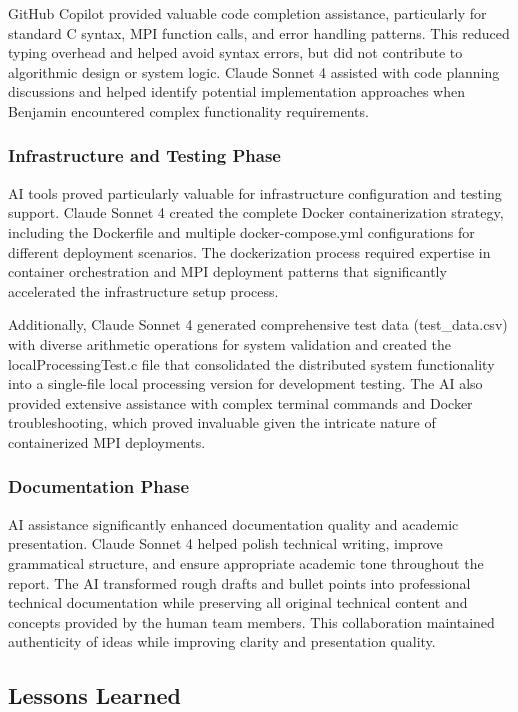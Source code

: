\documentclass{article}
\begin{document}
GitHub Copilot provided valuable code completion assistance, particularly for standard C syntax, MPI function calls, and error handling patterns. This reduced typing overhead and helped avoid syntax errors, but did not contribute to algorithmic design or system logic. Claude Sonnet 4 assisted with code planning discussions and helped identify potential implementation approaches when Benjamin encountered complex functionality requirements.

\subsubsection{Infrastructure and Testing Phase}
AI tools proved particularly valuable for infrastructure configuration and testing support. Claude Sonnet 4 created the complete Docker containerization strategy, including the Dockerfile and multiple docker-compose.yml configurations for different deployment scenarios. The dockerization process required expertise in container orchestration and MPI deployment patterns that significantly accelerated the infrastructure setup process.

Additionally, Claude Sonnet 4 generated comprehensive test data (test\_data.csv) with diverse arithmetic operations for system validation and created the localProcessingTest.c file that consolidated the distributed system functionality into a single-file local processing version for development testing. The AI also provided extensive assistance with complex terminal commands and Docker troubleshooting, which proved invaluable given the intricate nature of containerized MPI deployments.

\subsubsection{Documentation Phase}
AI assistance significantly enhanced documentation quality and academic presentation. Claude Sonnet 4 helped polish technical writing, improve grammatical structure, and ensure appropriate academic tone throughout the report. The AI transformed rough drafts and bullet points into professional technical documentation while preserving all original technical content and concepts provided by the human team members. This collaboration maintained authenticity of ideas while improving clarity and presentation quality.

\subsection{Lessons Learned}
\end{document}

